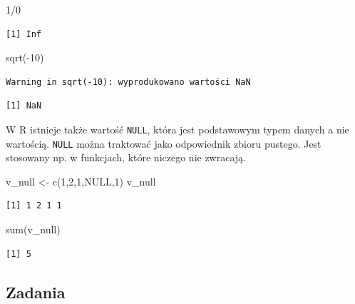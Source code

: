 \documentclass[
  letterpaper,
  DIV=11,
  numbers=noendperiod]{scrreprt}
\newenvironment{Shaded}{\begin{snugshade}}{\end{snugshade}}
\newcommand{\ConstantTok}[1]{\textcolor[rgb]{0.56,0.35,0.01}{#1}}
\newcommand{\DecValTok}[1]{\textcolor[rgb]{0.68,0.00,0.00}{#1}}
\newcommand{\FunctionTok}[1]{\textcolor[rgb]{0.28,0.35,0.67}{#1}}
\newcommand{\NormalTok}[1]{\textcolor[rgb]{0.00,0.23,0.31}{#1}}
\newcommand{\OtherTok}[1]{\textcolor[rgb]{0.00,0.23,0.31}{#1}}
\newcommand{\SpecialCharTok}[1]{\textcolor[rgb]{0.37,0.37,0.37}{#1}}
\begin{document}
\begin{Shaded}
\begin{Highlighting}[]
\DecValTok{1}\SpecialCharTok{/}\DecValTok{0}
\end{Highlighting}
\end{Shaded}

\begin{verbatim}
[1] Inf
\end{verbatim}

\begin{Shaded}
\begin{Highlighting}[]
\FunctionTok{sqrt}\NormalTok{(}\SpecialCharTok{{-}}\DecValTok{10}\NormalTok{)}
\end{Highlighting}
\end{Shaded}

\begin{verbatim}
Warning in sqrt(-10): wyprodukowano wartości NaN
\end{verbatim}

\begin{verbatim}
[1] NaN
\end{verbatim}

W R istnieje także wartość \texttt{NULL}, która jest podstawowym typem
danych a nie wartością. \texttt{NULL} można traktować jako odpowiednik
zbioru pustego. Jest stosowany np. w funkcjach, które niczego nie
zwracają.

\begin{Shaded}
\begin{Highlighting}[]
\NormalTok{v\_null }\OtherTok{\textless{}{-}} \FunctionTok{c}\NormalTok{(}\DecValTok{1}\NormalTok{,}\DecValTok{2}\NormalTok{,}\DecValTok{1}\NormalTok{,}\ConstantTok{NULL}\NormalTok{,}\DecValTok{1}\NormalTok{)}
\NormalTok{v\_null}
\end{Highlighting}
\end{Shaded}

\begin{verbatim}
[1] 1 2 1 1
\end{verbatim}

\begin{Shaded}
\begin{Highlighting}[]
\FunctionTok{sum}\NormalTok{(v\_null)}
\end{Highlighting}
\end{Shaded}

\begin{verbatim}
[1] 5
\end{verbatim}

\hypertarget{zadania}{%
\subsection{Zadania}\label{zadania}}
\end{document}
